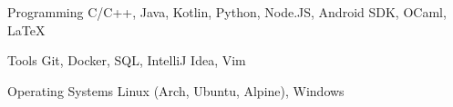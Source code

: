 

\begin{cvskills}

  \cvskill
    {Programming} %
    {C/C++, Java, Kotlin, Python, Node.JS, Android SDK, OCaml, LaTeX} %

  \cvskill
    {Tools} %
    {Git, Docker, SQL, IntelliJ Idea, Vim} %

  \cvskill
    {Operating Systems} %
    {Linux (Arch, Ubuntu, Alpine), Windows} %


\end{cvskills}

